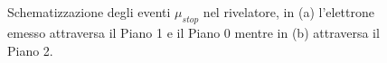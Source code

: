 \documentclass{standalone}
\begin{document}
\begin{figure}[H]
  \centering
  \\
  \\
  \caption{Schematizzazione degli eventi $\mu_{stop}$ nel rivelatore, in (a) l'elettrone emesso attraversa il Piano 1 e il Piano 0 mentre in (b) attraversa il Piano 2.}
  \label{fig:mu_stops}
\end{figure}
\end{document}
